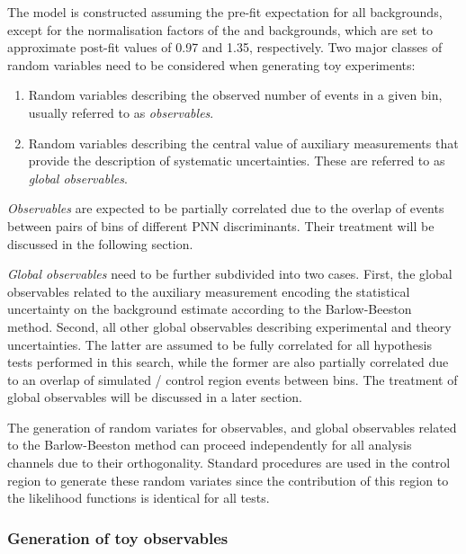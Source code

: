 The model is constructed assuming the pre-fit expectation for all
backgrounds, except for the normalisation factors of the \ttbar and
\ZHF backgrounds, which are set to approximate post-fit values of 0.97
and 1.35, respectively. Two major classes of random variables need to
be considered when generating toy experiments:
\begin{enumerate}
\item Random variables describing the observed number of events in a given
  bin, usually referred to as \emph{observables}.

\item Random variables describing the central value of auxiliary
  measurements that provide the description of systematic
  uncertainties. These are referred to as \emph{global observables}.
\end{enumerate}

\emph{Observables} are expected to be partially correlated due to the
overlap of events between pairs of bins of different PNN
discriminants. Their treatment will be discussed in the following
section.

\emph{Global observables} need to be further subdivided into two
cases. First, the global observables related to the auxiliary
measurement encoding the statistical uncertainty on the background
estimate %
according to the Barlow-Beeston method. Second, all other global
observables describing experimental and theory uncertainties. The
latter are assumed to be fully correlated for all hypothesis tests
performed in this search, while the former are also partially
correlated due to an overlap of simulated / control region events
between bins. The treatment of global observables will be discussed in
a later section.

The generation of random variates for observables, and global
observables related to the Barlow-Beeston method can proceed
independently for all analysis channels due to their
orthogonality. Standard procedures are used in the control region to
generate these random variates since the contribution of this region
to the likelihood functions is identical for all tests.


\subsubsection{Generation of toy observables}


